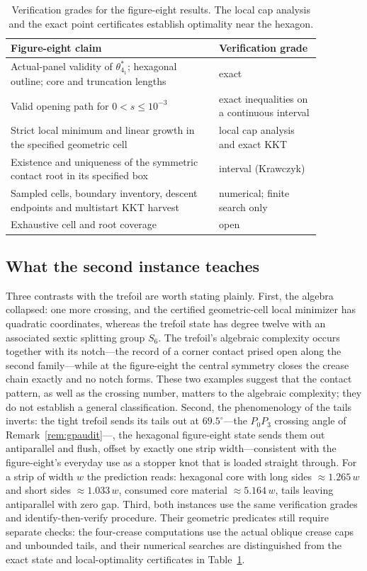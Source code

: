\begin{table}[tbp]
\centering\small
\renewcommand{\arraystretch}{1.15}
\begin{tabular}{p{0.58\linewidth}p{0.29\linewidth}}
\hline
\raggedright Figure-eight claim & \raggedright Verification grade\tabularnewline
\hline
\raggedright Actual-panel validity of $\theta^*_{4_1}$; hexagonal outline; core and truncation lengths & \raggedright exact\tabularnewline
\raggedright Valid opening path for $0<s\le10^{-3}$ & \raggedright exact inequalities on a continuous interval\tabularnewline
\raggedright Strict local minimum and linear growth in the specified geometric cell & local cap analysis and exact KKT\tabularnewline
\raggedright Existence and uniqueness of the symmetric contact root in its specified box & \raggedright interval (Krawczyk)\tabularnewline
\raggedright Sampled cells, boundary inventory, descent endpoints and multistart KKT harvest & \raggedright numerical; finite search only\tabularnewline
\raggedright Exhaustive cell and root coverage & open\tabularnewline
\hline
\end{tabular}
\caption{Verification grades for the figure-eight results. The local cap analysis and the exact point certificates establish optimality near the hexagon.}
\label{tab:figure8-grades}
\end{table}

\subsection{What the second instance teaches}
Three contrasts with the trefoil are worth stating plainly. First, the algebra collapsed: one more crossing, and the certified geometric-cell local minimizer has quadratic coordinates, whereas the trefoil state has degree twelve with an associated sextic splitting group $S_6$. The trefoil's algebraic complexity occurs together with its notch---the record of a corner contact prised open along the second family---while at the figure-eight the central symmetry closes the crease chain exactly and no notch forms. These two examples suggest that the contact pattern, as well as the crossing number, matters to the algebraic complexity; they do not establish a general classification. Second, the phenomenology of the tails inverts: the tight trefoil sends its tails out at $69.5^\circ$---the $P_0P_3$ crossing angle of Remark~\ref{rem:gpaudit}---, the hexagonal figure-eight state sends them out antiparallel and flush, offset by exactly one strip width---consistent with the figure-eight's everyday use as a stopper knot that is loaded straight through. For a strip of width $w$ the prediction reads: hexagonal core with long sides $\approx1.265\,w$ and short sides $\approx1.033\,w$, consumed core material $\approx5.164\,w$, tails leaving antiparallel with zero gap. Third, both instances use the same verification grades and identify-then-verify procedure. Their geometric predicates still require separate checks: the four-crease computations use the actual oblique crease caps and unbounded tails, and their numerical searches are distinguished from the exact state and local-optimality certificates in Table~\ref{tab:figure8-grades}.

